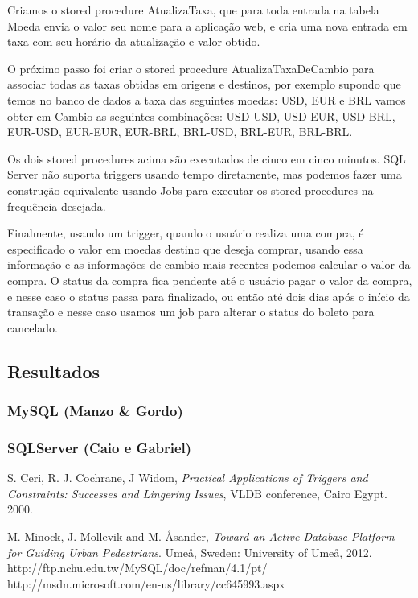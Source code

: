 \documentclass[conference]{IEEEtran}
\begin{document}
	Criamos o stored procedure AtualizaTaxa, que para toda entrada na tabela Moeda envia o valor seu nome para a aplicação web, e cria uma nova entrada em taxa com seu horário da atualização e valor obtido.

	O próximo passo foi criar o stored procedure AtualizaTaxaDeCambio para associar todas as taxas obtidas em origens e destinos, por exemplo supondo que temos no banco de dados a taxa das seguintes moedas: USD, EUR e BRL vamos obter em Cambio as seguintes combinações: USD-USD, USD-EUR, USD-BRL, EUR-USD, EUR-EUR, EUR-BRL, BRL-USD, BRL-EUR, BRL-BRL.

	Os dois stored procedures acima são executados de cinco em cinco minutos. SQL Server não suporta triggers usando tempo diretamente, mas podemos fazer uma construção equivalente usando Jobs para executar os stored procedures na frequência desejada.

	Finalmente, usando um trigger, quando o usuário realiza uma compra, é especificado o valor em moedas destino que deseja comprar, usando essa informação e as informações de cambio mais recentes podemos calcular o valor da compra. O status da compra fica pendente até o usuário pagar o valor da compra, e nesse caso o status passa para finalizado, ou então até dois dias após o início da transação e nesse caso usamos um job para alterar o status do boleto para cancelado.


  \subsection{Resultados}
    \subsubsection{MySQL (Manzo \& Gordo)}
    \subsubsection{SQLServer (Caio e Gabriel)}

\begin{thebibliography}{1}

S. Ceri, R. J. Cochrane, J Widom, \textit{Practical Applications of Triggers and Constraints: Successes and Lingering Issues}, VLDB conference, Cairo Egypt. 2000.

M. Minock, J. Mollevik and M. \r{A}sander, \textit{Toward an Active Database Platform for Guiding Urban Pedestrians}. Ume\r{a}, Sweden: University of Ume\r{a}, 2012.
http://ftp.nchu.edu.tw/MySQL/doc/refman/4.1/pt/
http://msdn.microsoft.com/en-us/library/cc645993.aspx
\end{thebibliography}
\end{document}
